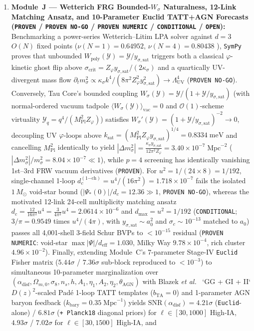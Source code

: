 \documentclass[11pt,a4paper]{article}
\begin{document}
\begin{enumerate}
\item \textbf{Module~J --- Wetterich FRG Bounded-\texorpdfstring{$W_\sigma$}{W\_sigma} Naturalness, 12-Link Matching Ansatz, and 10-Parameter Euclid TATT+AGN Forecasts (\texttt{PROVEN} / \texttt{PROVEN NO-GO} / \texttt{PROVEN NUMERIC} / \texttt{CONDITIONAL} / \texttt{OPEN}):}
Benchmarking a power-series Wetterich--Litim LPA solver against $d=3$ $O(N)$ fixed points ($\nu(N=1)=0.64952$, $\nu(N=4)=0.80438$ \cite{Litim2002}), \texttt{SymPy} proves that unbounded $W_{\mathrm{poly}}(\mathcal{Y}) = \mathcal{Y}/y_{\sigma,\mathrm{sat}}$ triggers both a classical $\varphi$-kinetic ghost flip above $\sigma_{\mathrm{crit}} = Z_\varphi y_{\sigma,\mathrm{sat}}/(2\kappa_\sigma)$ and a quartically UV-divergent mass flow $\partial_t m_\sigma^2 \propto \kappa_\sigma k^4/(8\pi^2 Z_\varphi^2 y_{\sigma,\mathrm{sat}}^2) \to \Lambda_{\mathrm{UV}}^4$ (\texttt{PROVEN NO-GO}). Conversely, Tau Core's bounded coupling $W_\sigma(\mathcal{Y}) = \mathcal{Y}/(1 + \mathcal{Y}/y_{\sigma,\mathrm{sat}})$ (with normal-ordered vacuum tadpole $\langle W_\sigma(\mathcal{Y})\rangle_{\mathrm{vac}} = 0$ and $\mathcal{O}(1)$-scheme virtuality $\mathcal{Y}_q = q^4/(M_{\mathrm{Pl}}^2 Z_\varphi)$) satisfies $W_\sigma'(\mathcal{Y}) = (1 + \mathcal{Y}/y_{\sigma,\mathrm{sat}})^{-2} \to 0$, decoupling UV $\varphi$-loops above $k_{\mathrm{sat}} = (M_{\mathrm{Pl}}^2 Z_\varphi y_{\sigma,\mathrm{sat}})^{1/4} = 0.8334\;\mathrm{meV}$ and cancelling $M_{\mathrm{Pl}}^2$ identically to yield $|\Delta m_\sigma^2| = \frac{\kappa_\sigma y_{\sigma,\mathrm{sat}}}{12\pi^2 Z_\varphi} = 3.40\times 10^{-7}\;\mathrm{Mpc}^{-2}$ ($|\Delta m_\sigma^2|/m_\sigma^2 = 8.04\times 10^{-7} \ll 1$), while $p=4$ screening has identically vanishing 1st--3rd FRW vacuum derivatives (\texttt{PROVEN}). For $u^2 = 1/(24\times 8) = 1/192$, single-channel 1-loop $d_c^{(1\mathrm{-ch})} = u^4/(16\pi^2) = 1.718\times 10^{-7}$ fails the isolated $1\,M_\odot$ void-star bound ($|\Psi_*(0)|/d_c = 12.36 \gg 1$, \texttt{PROVEN NO-GO}), whereas the motivated 12-link 24-cell multiplicity matching ansatz $d_c = \frac{12}{16\pi^2}u^4 = \frac{3}{4\pi^2}u^4 = 2.0614\times 10^{-6}$ and $d_{\max} = u^2 = 1/192$ (\texttt{CONDITIONAL}; $3/\pi = 0.9549$ times $u^4/(4\pi)$, with $y_{\sigma,\mathrm{sat}}\sim a_0^2$ and $\sigma_c\sim 10^{-13}$ matched to $a_0$) passes all 4,001-shell 3-field Schur BVPs to $<10^{-15}$ residual (\texttt{PROVEN NUMERIC}: void-star $\max|\Psi|/d_{\mathrm{eff}} = 1.030$, Milky Way $9.78\times 10^{-4}$, rich cluster $4.96\times 10^{-2}$). Finally, extending Module~C's 7-parameter Stage-IV \texttt{Euclid} Fisher matrix ($5.44\sigma$ / $7.36\sigma$ sub-block reproduced to $<10^{-3}$) to simultaneous 10-parameter marginalization over $(\alpha_{\mathrm{disf}}, \Omega_{m,0}, \sigma_8, n_s, h, A_1, \eta_1, A_2, \eta_2, \theta_{\mathrm{AGN}})$ with Blazek \textit{et al.}\ \cite{Blazek2019} `GG + GI + II` $D(z)^2$-scaled Pad\'e 1-loop TATT templates ($b_{\mathrm{TA}}=0$) and 1-parameter AGN baryon feedback ($k_{\mathrm{bary}}=0.35\;\mathrm{Mpc}^{-1}$) yields $\mathrm{SNR}(\alpha_{\mathrm{disf}}) = 4.21\sigma$ (\texttt{Euclid}-alone) / $6.81\sigma$ (\texttt{+ Planck18} diagonal priors) for $\ell\in[30,1000]$ High-IA, $4.93\sigma$ / $7.02\sigma$ for $\ell\in[30,1500]$ High-IA, and 
\end{enumerate}
\end{document}
